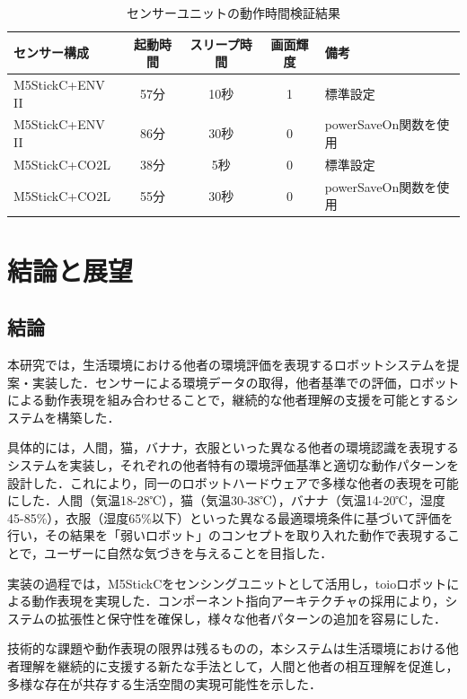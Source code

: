 \documentclass{cuxarticle}
\begin{document}
\begin{table}[h]
  \caption{センサーユニットの動作時間検証結果}
  \label{table:battery}
  \centering
  \begin{tabular}{|l|c|c|c|l|}
    \hline
    センサー構成 & 起動時間 & スリープ時間 & 画面輝度 & 備考 \\
    \hline
    M5StickC+ENV II & 57分 & 10秒 & 1 & 標準設定 \\
    \hline
    M5StickC+ENV II & 86分 & 30秒 & 0 & powerSaveOn関数を使用 \\
    \hline
    M5StickC+CO2L & 38分 & 5秒 & 0 & 標準設定 \\
    \hline
    M5StickC+CO2L & 55分 & 30秒 & 0 & powerSaveOn関数を使用 \\
    \hline
  \end{tabular}
\end{table}

\chapter{結論と展望}

\section{結論}
本研究では，生活環境における他者の環境評価を表現するロボットシステムを提案・実装した．センサーによる環境データの取得，他者基準での評価，ロボットによる動作表現を組み合わせることで，継続的な他者理解の支援を可能とするシステムを構築した．

具体的には，人間，猫，バナナ，衣服といった異なる他者の環境認識を表現するシステムを実装し，それぞれの他者特有の環境評価基準と適切な動作パターンを設計した．これにより，同一のロボットハードウェアで多様な他者の表現を可能にした．人間（気温18-28℃），猫（気温30-38℃），バナナ（気温14-20℃，湿度45-85\%），衣服（湿度65\%以下）といった異なる最適環境条件に基づいて評価を行い，その結果を「弱いロボット」のコンセプトを取り入れた動作で表現することで，ユーザーに自然な気づきを与えることを目指した．

実装の過程では，M5StickCをセンシングユニットとして活用し，toioロボットによる動作表現を実現した．コンポーネント指向アーキテクチャの採用により，システムの拡張性と保守性を確保し，様々な他者パターンの追加を容易にした．

技術的な課題や動作表現の限界は残るものの，本システムは生活環境における他者理解を継続的に支援する新たな手法として，人間と他者の相互理解を促進し，多様な存在が共存する生活空間の実現可能性を示した．
\end{document}

